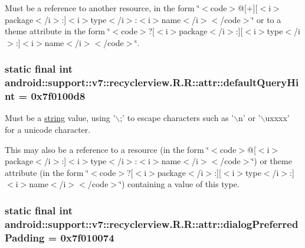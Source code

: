 Must be a reference to another resource, in the form \char`\"{}$<$code$>$@\mbox{[}+\mbox{]}\mbox{[}$<$i$>$package$<$/i$>$:\mbox{]}$<$i$>$type$<$/i$>$:$<$i$>$name$<$/i$>$$<$/code$>$\char`\"{} or to a theme attribute in the form \char`\"{}$<$code$>$?\mbox{[}$<$i$>$package$<$/i$>$:\mbox{]}\mbox{[}$<$i$>$type$<$/i$>$:\mbox{]}$<$i$>$name$<$/i$>$$<$/code$>$\char`\"{}. \hypertarget{classandroid_1_1support_1_1v7_1_1recyclerview_1_1_r_1_1attr_9a8d6ab94be3c83a9dda68af36ffa427}{
\subsubsection[{defaultQueryHint}]{\setlength{\rightskip}{0pt plus 5cm}static final int android::support::v7::recyclerview.R.R::attr::defaultQueryHint = 0x7f0100d8}}
\label{classandroid_1_1support_1_1v7_1_1recyclerview_1_1_r_1_1attr_9a8d6ab94be3c83a9dda68af36ffa427}


Must be a \hyperlink{classandroid_1_1support_1_1v7_1_1recyclerview_1_1_r_1_1string}{string} value, using '$\backslash$;' to escape characters such as '$\backslash$n' or '$\backslash$uxxxx' for a unicode character. 

This may also be a reference to a resource (in the form \char`\"{}$<$code$>$@\mbox{[}$<$i$>$package$<$/i$>$:\mbox{]}$<$i$>$type$<$/i$>$:$<$i$>$name$<$/i$>$$<$/code$>$\char`\"{}) or theme attribute (in the form \char`\"{}$<$code$>$?\mbox{[}$<$i$>$package$<$/i$>$:\mbox{]}\mbox{[}$<$i$>$type$<$/i$>$:\mbox{]}$<$i$>$name$<$/i$>$$<$/code$>$\char`\"{}) containing a value of this type. \hypertarget{classandroid_1_1support_1_1v7_1_1recyclerview_1_1_r_1_1attr_b54eee63333dae2c9ab8e5bfa7608b82}{
\subsubsection[{dialogPreferredPadding}]{\setlength{\rightskip}{0pt plus 5cm}static final int android::support::v7::recyclerview.R.R::attr::dialogPreferredPadding = 0x7f010074}}
\label{classandroid_1_1support_1_1v7_1_1recyclerview_1_1_r_1_1attr_b54eee63333dae2c9ab8e5bfa7608b82}


